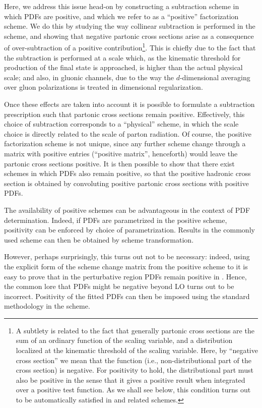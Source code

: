 Here, we address this issue head-on by constructing a subtraction scheme in
which PDFs are positive, and which we
refer to as a ``positive'' factorization scheme. We do this by
studying the way collinear subtraction is performed in the \msbar{}
scheme, and showing that negative partonic
cross sections arise as a consequence of
over-subtraction of a positive contribution\footnote{A subtlety is related to the fact that
  generally partonic cross sections are the sum of an ordinary
  function of the scaling variable, and a distribution localized at
  the kinematic threshold of the scaling variable. Here, by ``negative
  cross section'' we mean that the function (i.e., non-distributional
  part of the cross section) is negative. For positivity to hold, the
  distributional part must also be positive in the sense that it gives
a positive result when integrated over a positive test function. As we
shall see below, this condition turns out to be automatically satisfied
in \msbar{} and related schemes.}.
This is chiefly due to the fact that the subtraction is
performed at a scale which, as the  kinematic threshold for production
of the final state is approached,
is higher than the actual physical scale;
and also, in gluonic
channels, due to the way
the $d$-dimensional averaging over gluon polarizations is treated in
dimensional regularization.

Once these effects are taken into account
it is possible to formulate a subtraction prescription such that
partonic cross sections remain
positive. Effectively, this choice of subtraction corresponds to a ``physical''
scheme, in which the scale choice is directly related to the scale of
parton radiation.
Of course, the
positive factorization scheme is not unique, since any
further scheme change through a matrix with positive entries
(``positive matrix'', henceforth) would leave 
the partonic cross sections positive.  It is then possible to show that there exist
schemes in which PDFs also remain positive, so that the positive
hadronic cross section is obtained by convoluting positive
partonic cross sections with positive PDFs.

The availability of positive schemes can be
advantageous in the 
context of PDF determination. Indeed, if PDFs are
parametrized in the positive scheme, positivity can be enforced by
choice of parametrization. Results in the commonly used \msbar{} scheme
can then be obtained by scheme transformation.

However, perhaps surprisingly, this turns out not to be necessary:
indeed, using the explicit form of the scheme change
matrix from the positive scheme to \msbar{} it is easy to prove that in
the perturbative region  PDFs remain positive in
\msbar{}. Hence, the common lore that \msbar{} PDFs might be negative
beyond LO
turns out to be incorrect. Positivity of the fitted PDFs can then be imposed
using the standard methodology in the
\msbar{} scheme.

